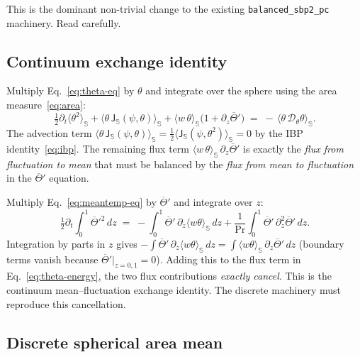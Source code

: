 \documentclass[11pt]{article}
\newcommand{\Jsphere}{\mathsf{J}_{\mathbb{S}}}
\newcommand{\meanS}[1]{\langle #1 \rangle_{\mathbb{S}}}
\newcommand{\Pr}{\mathrm{Pr}}
\begin{document}
This is the dominant non-trivial change to the existing
\verb|balanced_sbp2_pc| machinery.  Read carefully.

\subsection{Continuum exchange identity}

Multiply Eq.~\eqref{eq:theta-eq} by $\theta$ and integrate over the
sphere using the area measure~\eqref{eq:area}:
\begin{equation}
  \tfrac{1}{2}\partial_{t} \meanS{\theta^{2}}
  + \meanS{\theta\,\Jsphere(\psi, \theta)}
  + \meanS{w\,\theta}\bigl(1 + \partial_{z}\overline{\Theta}'\bigr)
  \;=\; -\,\meanS{\theta\,\mathcal{D}_{\theta}\theta}.
  \label{eq:theta-energy}
\end{equation}
The advection term $\meanS{\theta\,\Jsphere(\psi,\theta)} =
\tfrac{1}{2}\meanS{\Jsphere(\psi, \theta^{2})} = 0$ by the IBP
identity~\eqref{eq:ibp}.  The remaining flux term
$\meanS{w\,\theta}\,\partial_{z}\overline{\Theta}'$ is exactly the
\emph{flux from fluctuation to mean} that must be balanced by the
\emph{flux from mean to fluctuation} in the
$\overline{\Theta}'$ equation.

Multiply Eq.~\eqref{eq:meantemp-eq} by $\overline{\Theta}'$ and
integrate over $z$:
\begin{equation}
  \tfrac{1}{2}\partial_{t}\!\int_{0}^{1}\!\overline{\Theta}'^{2}\,dz
  \;=\; -\!\int_{0}^{1}\overline{\Theta}'\,\partial_{z}\meanS{w\theta}\,dz
  + \frac{1}{\Pr}\!\int_{0}^{1}\overline{\Theta}'\,\partial_{z}^{2}\overline{\Theta}'\,dz.
  \label{eq:thbar-energy}
\end{equation}
Integration by parts in $z$ gives $-\int \overline{\Theta}'\,
\partial_{z}\meanS{w\theta}\,dz = \int \meanS{w\theta}\,\partial_{z}
\overline{\Theta}'\,dz$ (boundary terms vanish because
$\overline{\Theta}'|_{z=0,1} = 0$).  Adding this to the flux term in
Eq.~\eqref{eq:theta-energy}, the two flux contributions \emph{exactly
cancel}.  This is the continuum mean--fluctuation exchange identity.
The discrete machinery must reproduce this cancellation.

\subsection{Discrete spherical area mean}
\end{document}
